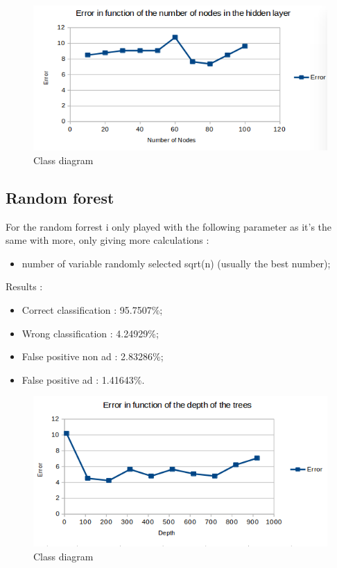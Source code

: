   \begin{figure}[h]
   \centering
   \includegraphics[scale=0.5]{../images/NNPO.png}
   \caption{Class diagram}
  \end{figure}

\subsection{Random forest}
For the random forrest i only played with the following parameter as it's the same with more, only giving more calculations :
  \begin{itemize}
    \item number of variable randomly selected sqrt(n) (usually the best number);
  \end{itemize}
Results :
\begin{itemize}
  \item Correct classification : 95.7507\%;
  \item Wrong classification : 4.24929\%;
  \item False positive non ad : 2.83286\%;
  \item False positive ad : 1.41643\%.
\end{itemize}

\begin{figure}[h]
 \centering
 \includegraphics[scale=0.5]{../images/RFPO.png}
 \caption{Class diagram}
\end{figure}
